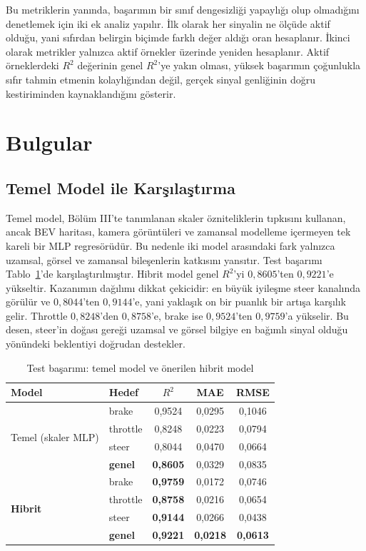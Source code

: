 \documentclass[conference]{IEEEtran}
\begin{document}
Bu metriklerin yanında, başarımın bir sınıf dengesizliği yapaylığı olup olmadığını denetlemek için iki ek analiz yapılır. İlk olarak her sinyalin ne ölçüde aktif olduğu, yani sıfırdan belirgin biçimde farklı değer aldığı oran hesaplanır. İkinci olarak metrikler yalnızca aktif örnekler üzerinde yeniden hesaplanır. Aktif örneklerdeki $R^2$ değerinin genel $R^2$'ye yakın olması, yüksek başarımın çoğunlukla sıfır tahmin etmenin kolaylığından değil, gerçek sinyal genliğinin doğru kestiriminden kaynaklandığını gösterir.

\section{Bulgular}
\label{sec:results}

\subsection{Temel Model ile Karşılaştırma}

Temel model, Bölüm III'te tanımlanan skaler özniteliklerin tıpkısını kullanan, ancak BEV haritası, kamera görüntüleri ve zamansal modelleme içermeyen tek kareli bir MLP regresörüdür. Bu nedenle iki model arasındaki fark yalnızca uzamsal, görsel ve zamansal bileşenlerin katkısını yansıtır. Test başarımı Tablo~\ref{tab:main}'de karşılaştırılmıştır. Hibrit model genel $R^2$'yi $0{,}8605$'ten $0{,}9221$'e yükseltir. Kazanımın dağılımı dikkat çekicidir: en büyük iyileşme steer kanalında görülür ve $0{,}8044$'ten $0{,}9144$'e, yani yaklaşık on bir puanlık bir artışa karşılık gelir. Throttle $0{,}8248$'den $0{,}8758$'e, brake ise $0{,}9524$'ten $0{,}9759$'a yükselir. Bu desen, steer'in doğası gereği uzamsal ve görsel bilgiye en bağımlı sinyal olduğu yönündeki beklentiyi doğrudan destekler.

\begin{table}[t]
\caption{Test başarımı: temel model ve önerilen hibrit model}
\label{tab:main}
\centering
\footnotesize
\renewcommand{\arraystretch}{1.2}
\begin{tabular}{@{}llccc@{}}
\toprule
\textbf{Model} & \textbf{Hedef} & \textbf{$R^2$} & \textbf{MAE} & \textbf{RMSE} \\
\midrule
\multirow{4}{*}{Temel (skaler MLP)}
 & brake    & 0,9524 & 0,0295 & 0,1046 \\
 & throttle & 0,8248 & 0,0223 & 0,0794 \\
 & steer    & 0,8044 & 0,0470 & 0,0664 \\
 & \textbf{genel} & \textbf{0,8605} & 0,0329 & 0,0835 \\
\midrule
\multirow{4}{*}{\textbf{Hibrit}}
 & brake    & \textbf{0,9759} & 0,0172 & 0,0746 \\
 & throttle & \textbf{0,8758} & 0,0216 & 0,0654 \\
 & steer    & \textbf{0,9144} & 0,0266 & 0,0438 \\
 & \textbf{genel} & \textbf{0,9221} & \textbf{0,0218} & \textbf{0,0613} \\
\bottomrule
\end{tabular}
\end{table}
\end{document}
